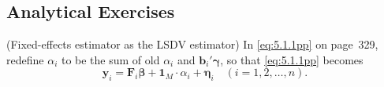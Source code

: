 
\begin{problemset}

\subsection*{Analytical Exercises}

\exercise[1]
(Fixed-effects estimator as the LSDV estimator)\quad
In \eqref{eq:5.1.1pp} on page~329, redefine $\alpha_i$ to be the sum of old $\alpha_i$ and
$\mathbf{b}_i'\boldsymbol{\gamma}$, so that \eqref{eq:5.1.1pp} becomes
\begin{equation}
  \mathbf{y}_i = \mathbf{F}_i\boldsymbol{\beta} + \mathbf{1}_M \cdot \alpha_i + \boldsymbol{\eta}_i
  \quad (i = 1, 2, \ldots, n). \tag{1}
\end{equation}


\end{problemset}
